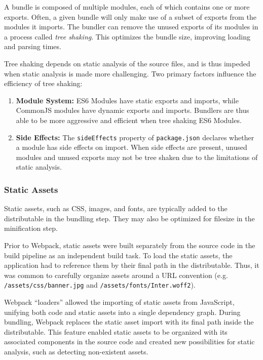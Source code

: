 \documentclass{article}
\newcommand{\ti}{\textit}
\newcommand{\tb}{\textbf}
\newcommand{\tc}{\texttt}
\begin{document}
A bundle is composed of multiple modules, each of which contains one or more exports. Often, a given
bundle will only make use of a subset of exports from the modules it imports. The bundler can remove
the unused exports of its modules in a process called \ti{tree shaking}. This optimizes the bundle
size, improving loading and parsing times.

Tree shaking depends on static analysis of the source files, and is thus impeded when static
analysis is made more challenging. Two primary factors influence the efficiency of tree shaking:

\begin{enumerate}
  \item \tb{Module System:} ES6 Modules have static exports and imports, while CommonJS modules have
    dynamic exports and imports. Bundlers are thus able to be more aggressive and efficient when
    tree shaking ES6 Modules.

  \item \tb{Side Effects:} The \tc{sideEffects} property of \texttt{package.json} declares whether a
    module has side effects on import. When side effects are present, unused modules and unused
    exports may not be tree shaken due to the limitations of static analysis.
\end{enumerate}

\subsubsection{Static Assets}

Static assets, such as CSS, images, and fonts, are typically added to the distributable in the
bundling step. They may also be optimized for filesize in the minification step.

Prior to Webpack, static assets were built separately from the source code in the build pipeline as
an independent build task. To load the static assets, the application had to reference them by their
final path in the distributable. Thus, it was common to carefully organize assets around a URL
convention (e.g. \tc{/assets/css/banner.jpg} and \texttt{/assets/fonts/Inter.woff2}).

Webpack ``loaders'' allowed the importing of static assets from JavaScript, unifying both code and
static assets into a single dependency graph. During bundling, Webpack replaces the static asset
import with its final path inside the distributable. This feature enabled static assets to be
organized with its associated components in the source code and created new possibilities for static
analysis, such as detecting non-existent assets.
\end{document}
